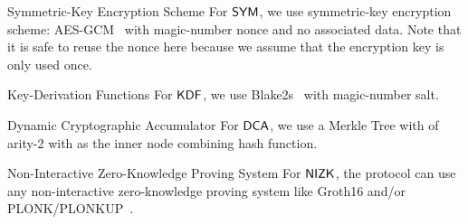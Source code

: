 \begin{definitiontoc}{Symmetric-Key Encryption Scheme}
    For ${\textsf{SYM}}$, we use symmetric-key encryption scheme: AES-GCM~\cite{rfc5288} with magic-number nonce and no associated data. Note that it is safe to reuse the nonce here because we assume that the encryption key is only used once.
\end{definitiontoc}

\begin{definitiontoc}{Key-Derivation Functions}
    For ${\textsf{KDF}}$, we use Blake2s~\cite{rfc7693} with magic-number salt.
\end{definitiontoc}

\begin{definitiontoc}{Dynamic Cryptographic Accumulator}
    For ${\textsf{DCA}}$, we use a Merkle Tree with of arity-2 with \Poseidon{} as the inner node combining hash function.

\end{definitiontoc}

\begin{definitiontoc}{Non-Interactive Zero-Knowledge Proving System} \label{def:concrete-zkp}
    For ${\textsf{NIZK}}$, the protocol can use any non-interactive zero-knowledge proving system like Groth16 \cite{KRRS21USENIX} and/or PLONK/PLONKUP~\cite{plonk,plonkup}. 
\end{definitiontoc}

